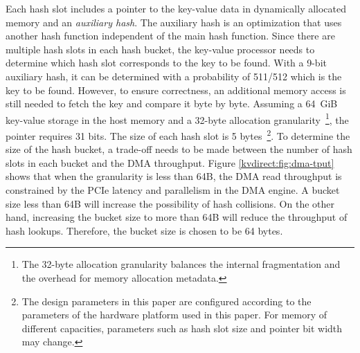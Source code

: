 Each hash slot includes a pointer to the key-value data in dynamically allocated memory and an \textit{auxiliary hash}. The auxiliary hash is an optimization that uses another hash function independent of the main hash function. Since there are multiple hash slots in each hash bucket, the key-value processor needs to determine which hash slot corresponds to the key to be found. With a 9-bit auxiliary hash, it can be determined with a probability of 511/512 which is the key to be found. However, to ensure correctness, an additional memory access is still needed to fetch the key and compare it byte by byte. Assuming a 64~GiB key-value storage in the host memory and a 32-byte allocation granularity~\footnote{The 32-byte allocation granularity balances the internal fragmentation and the overhead for memory allocation metadata.}, the pointer requires 31 bits. The size of each hash slot is 5 bytes~\footnote{The design parameters in this paper are configured according to the parameters of the hardware platform used in this paper. For memory of different capacities, parameters such as hash slot size and pointer bit width may change.}. To determine the size of the hash bucket, a trade-off needs to be made between the number of hash slots in each bucket and the DMA throughput. Figure \ref{kvdirect:fig:dma-tput} shows that when the granularity is less than 64B, the DMA read throughput is constrained by the PCIe latency and parallelism in the DMA engine. A bucket size less than 64B will increase the possibility of hash collisions. On the other hand, increasing the bucket size to more than 64B will reduce the throughput of hash lookups. Therefore, the bucket size is chosen to be 64 bytes.


